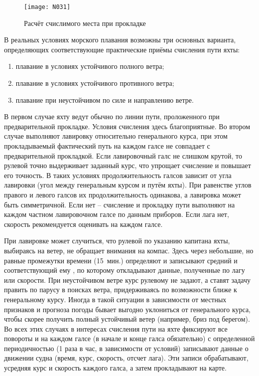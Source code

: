 \begin{figure}[htb]
  \centering{}
  \texttt{[image: N031]}
  \caption{Расчёт счислимого места при прокладке}
  \label{fig:N31}
\end{figure}

В реальных условиях морского плавания возможны три основных варианта,
определяющих соответствующие практические приёмы счисления пути яхты:

\begin{enumerate}
\item плавание в условиях устойчивого полного ветра; 
\item плавание в условиях устойчивого противного ветра; 
\item плавание при неустойчивом по силе и направлению ветре. 
\end{enumerate}

В первом случае яхту ведут обычно по линии пути, проложенного при
предварительной прокладке. Условия счисления здесь благоприятные. Во
втором случае выполняют лавировку относительно генерального курса, при
этом прокладываемый фактический путь на каждом галсе не совпадает с
предварительной прокладкой. Если лавировочный галс не слишком крутой,
то рулевой точно выдерживает заданный курс, что упрощает счисление и
повышает его точность. В таких условиях продолжительность галсов
зависит от угла лавировки (угол между генеральным курсом и путём
яхты). При равенстве углов правого и левого галсов их
продолжительность одинакова, а лавировка может быть симметричной. Если
нет \--- счисление и прокладку пути выполняют на каждом частном
лавировочном галсе по данным приборов. Если лага нет, скорость
рекомендуется оценивать на каждом галсе.
 
При лавировке может случиться, что рулевой по указанию капитана яхты,
выбираясь на ветер, не обращает внимания на компас. Здесь через
небольшие, но равные промежутки времени (15~мин.) определяют и
записывают средний \KK и соответствующий ему \IK, по которому
откладывают данные, полученные по лагу или скорости. При неустойчивом
ветре курс рулевому не задают, а ставят задачу править по парусу в
поисках ветра, придерживаясь по возможности ближе к генеральному
курсу. Иногда в такой ситуации в зависимости от местных признаков и
прогноза погоды бывает выгодно уклониться от генерального курса, чтобы
скорее получить полный устойчивый ветер (например, бриз под
берегом). Во всех этих случаях в интересах счисления пути на яхте
фиксируют все повороты и на каждом галсе (в начале и конце галса
обязательно) с определенной периодичностью (1 раза в час, в
зависимости от условий) записывают данные о движении судна (время,
курс, скорость, отсчет лага). Эти записи обрабатывают, усредняя курс и
скорость каждого галса, а затем прокладывают на карте.

